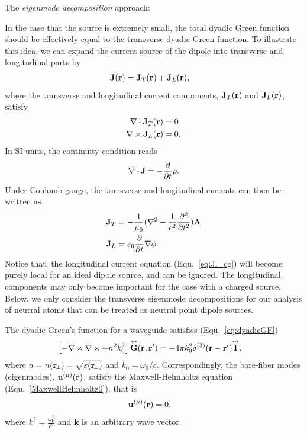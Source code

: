 The \textit{eigenmode decomposition} approach:

In the case that the source is extremely small, the total dyadic Green function should be effectively equal to the transverse dyadic Green function. To illustrate this idea, we can expand the current source of the dipole into transverse and longitudinal parts by
\begin{align}
\mathbf{J}(\mathbf{r}) &= \mathbf{J}_T(\mathbf{r}) + \mathbf{J}_L(\mathbf{r}),
\end{align}
where the transverse and longitudinal current components, $ \mathbf{J}_T(\mathbf{r}) $ and $\mathbf{J}_L(\mathbf{r})$, satisfy
\begin{align}
\nabla\cdot\mathbf{J}_T (\mathbf{r}) &=0\\
\nabla\times \mathbf{J}_L (\mathbf{r}) &=0.
\end{align}
In SI units, the continuity condition reads
\begin{align}
\nabla\cdot\mathbf{J}=-\frac{\partial {}}{\partial {t}}\rho.
\end{align}
Under Coulomb gauge, the transverse and longitudinal currents can then be written as 
\begin{align}
\mathbf{J}_T &= -\frac{1}{\mu_0}(\nabla^2 -\frac{1}{c^2}\spp{}{t})\mathbf{A}\label{eq:Jt_cg}\\
\mathbf{J}_L &= \varepsilon_0 \pp{}{t}\nabla\phi .\label{eq:Jl_cg}
\end{align}
Notice that, the longitudinal current equation (Equ.~\eqref{eq:Jl_cg}) will become purely local for an ideal dipole source, and can be ignored. The longitudinal components may only become important for the case with a charged source. Below, we only consider the transverse eigenmode decompositions for our analysis of neutral atoms that can be treated as neutral point dipole sources.

The dyadic Green's function for a waveguide satisfies (Equ.~\eqref{eq:dyadicGF})
\begin{align}
\left[ -\nabla\times\nabla\times + n^2k_0^2 \right] \overset{\leftrightarrow}{\bf G}(\mathbf{r},\mathbf{r}') &= -4\pi k_0^2\delta^{(3)}(\mathbf{r}-\mathbf{r}')\overset{\leftrightarrow}{\bf I},
\end{align}
where $n=n(\mathbf{r}\!_\perp)=\sqrt{\varepsilon(\mathbf{r}\!_\perp)}$ and $k_0=\omega_0/c$. Correspondingly, the bare-fiber modes (eigenmodes), $ \mathbf{u}^{(\mu)}(\mathbf{r}) $, satisfy the Maxwell-Helmholtz equation (Equ.~\eqref{MaxwellHelmholtz0}), that is
\begin{align}
[-\nabla\times\nabla\times + n^2(\br)k^2]  \mathbf{u}^{(\mu)}(\br) &=0,
\end{align}
where $ k^2=\frac{\omega_{\mathbf{k}}^2}{c^2} $ and $ \mathbf{k} $ is an arbitrary wave vector.

